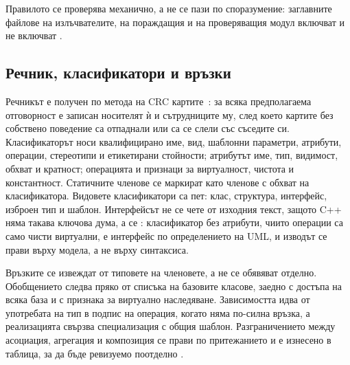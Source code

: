 Правилото се проверява механично, а не се пази по споразумение: заглавните файлове на излъчвателите,
на пораждащия и на проверяващия модул включват  и не включват .

\subsection{Речник, класификатори и връзки}

Речникът е получен по метода на CRC картите~\cite{beck1989crc}: за всяка предполагаема отговорност е
записан носителят ѝ и сътрудниците му, след което картите без собствено поведение са отпаднали или са
се слели със съседите си. Класификаторът носи квалифицирано име, вид, шаблонни параметри, атрибути,
операции, стереотипи и етикетирани стойности; атрибутът име, тип, видимост, обхват и кратност;
операцията и признаци за виртуалност, чистота и константност. Статичните членове се маркират като
членове с обхват на класификатора. Видовете класификатори са пет: клас, структура, интерфейс, изброен
тип и шаблон. Интерфейсът не се чете от изходния текст, защото C++ няма такава ключова дума, а се
: класификатор без атрибути, чиито операции са само чисти виртуални, е интерфейс по
определението на UML, и изводът се прави върху модела, а не върху синтаксиса.

Връзките се извеждат от типовете на членовете, а не се обявяват отделно. Обобщението следва пряко
от списъка на базовите класове, заедно с достъпа на всяка база и с признака за виртуално
наследяване. Зависимостта идва от употребата на тип в подпис на операция, когато няма по-силна
връзка, а реализацията свързва специализация с общия шаблон. Разграничението между асоциация,
агрегация и композиция се прави по притежанието и е изнесено в таблица, за да бъде ревизуемо
поотделно .

